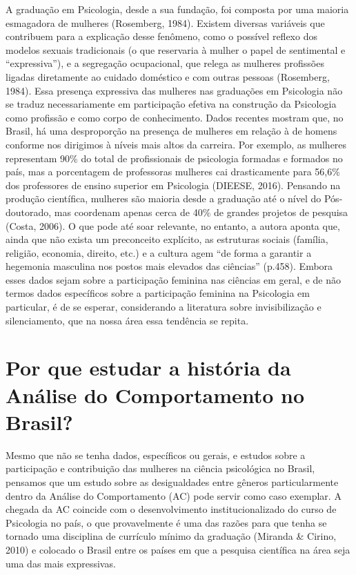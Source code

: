 A graduação em Psicologia, desde a sua fundação, foi composta por uma maioria esmagadora de mulheres (Rosemberg, 1984). Existem diversas variáveis que contribuem para a explicação desse fenômeno, como o possível reflexo dos modelos sexuais tradicionais (o que reservaria à mulher o papel de sentimental e “expressiva”), e a segregação ocupacional, que relega as mulheres profissões ligadas diretamente ao cuidado doméstico e com outras pessoas (Rosemberg, 1984). Essa presença expressiva das mulheres nas graduações em Psicologia não se traduz necessariamente em participação efetiva na construção da Psicologia como profissão e como corpo de conhecimento.  Dados recentes mostram que, no Brasil, há uma desproporção na presença de mulheres em relação à de homens conforme nos dirigimos à níveis mais altos da carreira. Por exemplo, as mulheres representam 90\% do total de profissionais de psicologia formadas e formados no país, mas a porcentagem de professoras mulheres cai drasticamente para 56,6\% dos professores de ensino superior em Psicologia (DIEESE, 2016).  Pensando na produção científica, mulheres são maioria desde a graduação até o nível do Pós-doutorado, mas coordenam apenas cerca de 40\% de grandes projetos de pesquisa (Costa, 2006). O que pode até soar relevante, no entanto, a autora aponta que, ainda que não exista um preconceito explícito, as estruturas sociais (família, religião, economia, direito, etc.) e a cultura agem “de forma a garantir a hegemonia masculina nos postos mais elevados das ciências” (p.458). Embora esses dados sejam sobre a participação feminina nas ciências em geral, e de não termos dados específicos sobre a participação feminina na Psicologia em particular, é de se esperar, considerando a literatura sobre invisibilização e silenciamento, que na nossa área essa tendência se repita.
\vfill

\section{Por que estudar a história da Análise do Comportamento no Brasil?}

Mesmo que não se tenha dados, específicos ou gerais, e estudos sobre a participação e contribuição das mulheres na ciência psicológica no Brasil, pensamos que um estudo sobre as desigualdades entre gêneros particularmente dentro da Análise do Comportamento (AC) pode servir como caso exemplar. A chegada da AC coincide com o desenvolvimento institucionalizado do curso de Psicologia no país, o que provavelmente é uma das razões para que tenha se tornado uma disciplina de currículo mínimo da graduação (Miranda \& Cirino, 2010) e colocado o Brasil entre os países em que a pesquisa científica na área seja uma das mais expressivas. 

